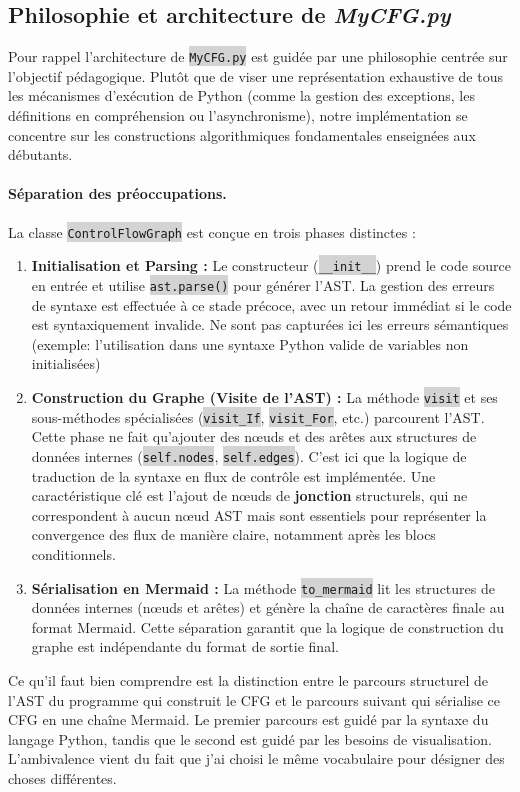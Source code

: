 \documentclass[11pt,a4paper]{article}
\newcommand{\code}[1]{\colorbox{lightgray}{\texttt{\small #1}}}
\begin{document}
\subsection{Philosophie et architecture de \textit{MyCFG.py}}

Pour rappel l'architecture de \code{MyCFG.py} est guidée par une philosophie centrée sur l'objectif pédagogique. Plutôt que de viser une représentation exhaustive de tous les mécanismes d'exécution de Python (comme la gestion des exceptions, les définitions en compréhension ou l'asynchronisme), notre implémentation se concentre sur les constructions algorithmiques fondamentales enseignées aux débutants.

\paragraph{Séparation des préoccupations.} La classe \code{ControlFlowGraph} est conçue en trois phases distinctes :
\begin{enumerate}
    \item \textbf{Initialisation et Parsing :} Le constructeur (\code{\_\_init\_\_}) prend le code source en entrée et utilise \code{ast.parse()} pour générer l'AST. La gestion des erreurs de syntaxe est effectuée à ce stade précoce, avec un retour immédiat si le code est syntaxiquement invalide. Ne sont pas capturées ici les erreurs sémantiques (exemple: l'utilisation dans une syntaxe Python valide de variables non initialisées)
    \item \textbf{Construction du Graphe (Visite de l'AST) :} La méthode \code{visit} et ses sous-méthodes spécialisées (\code{visit\_If}, \code{visit\_For}, etc.) parcourent l'AST. Cette phase ne fait qu'ajouter des nœuds et des arêtes aux structures de données internes (\code{self.nodes}, \code{self.edges}). C'est ici que la logique de traduction de la syntaxe en flux de contrôle est implémentée. Une caractéristique clé est l'ajout de nœuds de \textbf{jonction} structurels, qui ne correspondent à aucun nœud AST mais sont essentiels pour représenter la convergence des flux de manière claire, notamment après les blocs conditionnels.
    \item \textbf{Sérialisation en Mermaid :} La méthode \code{to\_mermaid} lit les structures de données internes (nœuds et arêtes) et génère la chaîne de caractères finale au format Mermaid. Cette séparation garantit que la logique de construction du graphe est indépendante du format de sortie final.
\end{enumerate}
Ce qu'il faut bien comprendre est la distinction entre le parcours structurel de l'AST du programme qui construit le CFG et le parcours suivant qui sérialise ce CFG en une chaîne Mermaid. Le premier parcours est guidé par la syntaxe du langage Python, tandis que le second est guidé par les besoins de visualisation.
L’ambivalence vient du fait que j'ai choisi le même vocabulaire pour désigner des choses différentes.
\end{document}
